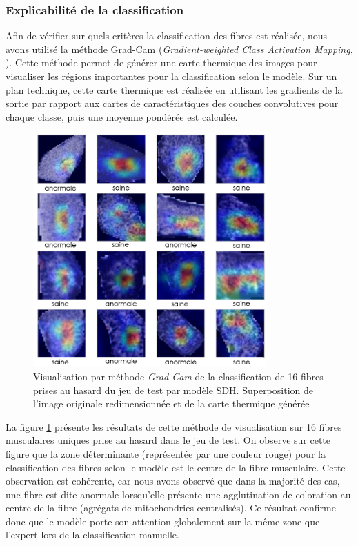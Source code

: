\subsubsection{Explicabilité de la classification}
Afin de vérifier sur quels critères la classification des fibres est réalisée, nous avons utilisé la méthode Grad-Cam (\textit{Gradient-weighted Class Activation Mapping}, \cite{selvaraju_grad-cam_2020}). Cette méthode permet de générer une carte thermique des images pour visualiser les régions importantes pour la classification selon le modèle. Sur un plan technique, cette carte thermique est réalisée en utilisant les gradients de la sortie par rapport aux cartes de caractéristiques des couches convolutives pour chaque classe, puis une moyenne pondérée est calculée.

\begin{figure}[!ht]
 \centering
 \includegraphics[width=0.8\textwidth]{figures/sdh_gradcam.png}
 \caption[Visualisation par méthode \textit{Grad-Cam} du modèle SDH]{Visualisation par méthode  \textit{Grad-Cam} de la classification de 16 fibres prises au hasard du jeu de test par modèle SDH. Superposition de l'image originale redimensionnée et de la carte thermique générée}
 \label{fig:gradcam_sdh}
\end{figure}
La figure \ref{fig:gradcam_sdh} présente les résultats de cette méthode de visualisation sur 16 fibres musculaires uniques prise au hasard dans le jeu de test. On observe sur cette figure que la zone déterminante (représentée par une couleur rouge) pour la classification des fibres selon le modèle est le centre de la fibre musculaire. Cette observation est cohérente, car nous avons observé que dans la majorité des cas, une fibre est dite anormale lorsqu'elle présente une agglutination de coloration au centre de la fibre (agrégats de mitochondries centralisés). Ce résultat confirme donc que le modèle porte son attention globalement sur la même zone que l'expert lors de la classification manuelle. 


